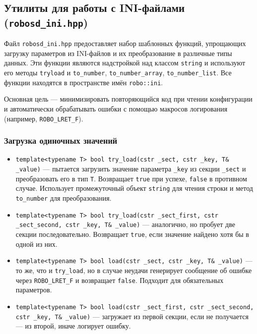 \documentclass[a4paper,12pt]{article}
\begin{document}
\subsection{Утилиты для работы с INI-файлами (\texttt{robosd\_ini.hpp})}

Файл \texttt{robosd\_ini.hpp} предоставляет набор шаблонных функций, упрощающих загрузку параметров из INI-файлов и их преобразование в различные типы данных. Эти функции являются надстройкой над классом \texttt{string} и используют его методы \texttt{tryload} и \texttt{to\_number}, \texttt{to\_number\_array}, \texttt{to\_number\_list}. Все функции находятся в пространстве имён \texttt{robo::ini}.

Основная цель — минимизировать повторяющийся код при чтении конфигурации и автоматически обрабатывать ошибки с помощью макросов логирования (например, \texttt{ROBO\_LRET\_F}).

\subsubsection{Загрузка одиночных значений}

\begin{itemize}
    \item \texttt{template<typename T> bool try\_load(cstr \_sect, cstr \_key, T\& \_value)} — пытается загрузить значение параметра \texttt{\_key} из секции \texttt{\_sect} и преобразовать его в тип \texttt{T}. Возвращает \texttt{true} при успехе, \texttt{false} в противном случае. Использует промежуточный объект \texttt{string} для чтения строки и метод \texttt{to\_number} для преобразования.
    
    \item \texttt{template<typename T> bool try\_load(cstr \_sect\_first, cstr \_sect\_second, cstr \_key, T\& \_value)} — аналогично, но пробует две секции последовательно. Возвращает \texttt{true}, если значение найдено хотя бы в одной из них.
    
    \item \texttt{template<typename T> bool load(cstr \_sect, cstr \_key, T\& \_value)} — то же, что и \texttt{try\_load}, но в случае неудачи генерирует сообщение об ошибке через \texttt{ROBO\_LRET\_F} и возвращает \texttt{false}. Подходит для обязательных параметров.
    
    \item \texttt{template<typename T> bool load(cstr \_sect\_first, cstr \_sect\_second, cstr \_key, T\& \_value)} — загружает из первой секции, если не получается — из второй, иначе логирует ошибку.
\end{itemize}
\end{document}
